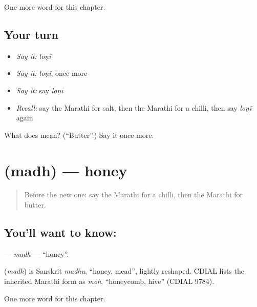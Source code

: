 \begin{grammarlens}[title={What you've built}]
One more word for this chapter.
\end{grammarlens}

\subsection*{Your turn}
\begin{itemize}
\raggedright
  \item \emph{Say it:} \emph{loṇī}
  \item \emph{Say it:} \emph{loṇī}, once more
  \item \emph{Say it:} say \emph{loṇī}
  \item \emph{Recall:} say the Marathi for salt, then the Marathi for a chilli, then say \emph{loṇī} again
\end{itemize}

\begin{tcolorbox}[breakable,colback=teal!4,colframe=teal!35!black,title={Before you move on}]
What does  mean? (\textquotedblleft{}Butter\textquotedblright{}.) Say it once more.
\end{tcolorbox}
\section[\texorpdfstring{\mr{मध} (madh)}{मध (madh)}]{ (madh) — honey}

\label{lesson:MR-C87-madh}



\begin{quote}
Before the new one: say the Marathi for a chilli, then the Marathi for butter.
\end{quote}

\subsection*{You'll want to know: }
\textbf{} — \emph{madh} — \textquotedblleft{}honey\textquotedblright{}.

\begin{cousinweb}
\textbf{} (\emph{madh}) is Sanskrit \emph{madhu}, \textquotedblleft{}honey, mead\textquotedblright{}, lightly reshaped. CDIAL lists the inherited Marathi form as \emph{moh}, \textquotedblleft{}honeycomb, hive\textquotedblright{} (CDIAL 9784).
\end{cousinweb}

\begin{grammarlens}[title={What you've built}]
One more word for this chapter.
\end{grammarlens}


